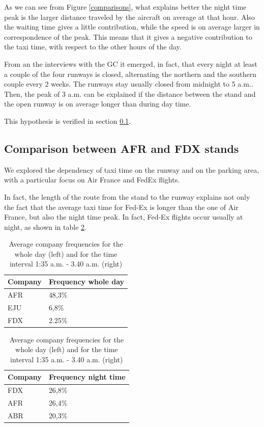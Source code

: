 \documentclass{article}
\begin{document}
As we can see from Figure \ref{comparisons}, what explains better the night time peak is the larger distance traveled by the aircraft on average at that hour. Also the waiting time gives a little contribution, while the speed is on average larger in correspondence of the peak. This means that it gives a negative contribution to the taxi time, with respect to the other hours of the day.

From an the interviews with the GC it emerged, in fact, that every night at least a couple of the four runways is closed, alternating the northern and the southern couple every 2 weeks. The runways stay usually closed from midnight to 5 a.m..
Then, the peak of 3 a.m. can be explained if the distance between the stand and the open runway is on average longer than during day time.

This hypothesis is verified in section \ref{comparison}.


\subsection{Comparison between AFR and FDX stands}\label{comparison}

We explored the dependency of taxi time on the runway and on the parking area, with a particular focus on Air France and FedEx flights. 

In fact, the length of the route from the stand to the runway explains not only the fact that the average taxi time for Fed-Ex is longer than the one of Air France, but also the night time peak. In fact, Fed-Ex flights occur usually at night, as shown in table \ref{companiesNight}.



\begin{table}[h!!!!!!!!!!!!!!!!]
	\begin{center}
		\caption{Average company frequencies for the whole day (left) and for the time interval 1:35 a.m. - 3.40 a.m. (right)}
		\label{companiesNight}
		\begin{tabular}{p{1.5cm}p{2cm}} %
			\textbf{Company} & \textbf{Frequency whole day}\\
			\hline
			AFR & 48,3\% \\
			EJU & 6,8\% \\
			FDX & 2.25\% \\
		\end{tabular}
		\quad
		\begin{tabular}{p{1.5cm}p{2cm}} %
			\textbf{Company} & \textbf{Frequency night time}\\
			\hline
			FDX & 26,8\% \\
			AFR & 26,4\% \\
			ABR & 20,3\% \\
		\end{tabular}
	\end{center}
\end{table}
\end{document}
